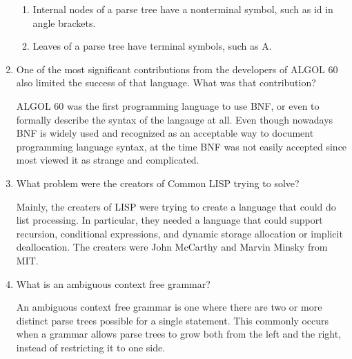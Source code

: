 \begin{enumerate}
  \begin{answer}

  \begin{enumerate}
    \item Internal nodes of a parse tree have a nonterminal symbol, such as id in angle brackets.
    \item Leaves of a parse tree have terminal symbols, such as A.
    \end{enumerate}

    \end{answer}


  \item One of the most significant contributions from the developers
    of ALGOL 60 also limited the success of that language. What was
    that contribution?

  \begin{answer}
    ALGOL 60 was the first programming language to use BNF, or even to formally describe the syntax of the langauge at all. Even though nowadays BNF is widely used and recognized as an acceptable way to document programming language syntax, at the time BNF was not easily accepted since most viewed it as strange and complicated.
    

    \end{answer}

  \item What problem were the creators of Common LISP trying to solve?

  \begin{answer}

    Mainly, the creaters of LISP were trying to create a language that could do list processing. In particular, they needed a language that could support recursion, conditional expressions, and dynamic storage allocation or implicit deallocation. The creaters were John McCarthy and Marvin Minsky from MIT.

    \end{answer}

  \item What is an ambiguous context free grammar?

  \begin{answer}

    An ambiguous context free grammar is one where there are two or more distinct parse trees possible for a single statement. This commonly occurs when a grammar allows parse trees to grow both from the left and the right, instead of restricting it to one side.


\end{answer}
\end{enumerate}
